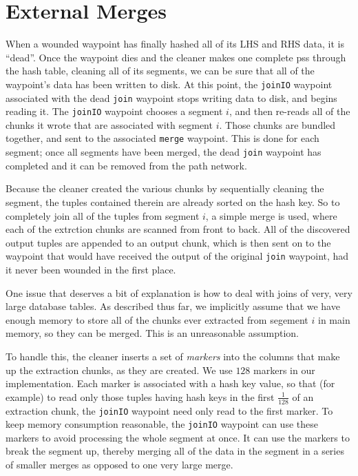 \documentclass{sig-alternate}
\renewcommand\:{\colon} %
\begin{document}
\section{External Merges}

When a wounded waypoint has finally hashed all of its LHS and RHS data, it is ``dead''.  Once the waypoint dies and the cleaner makes one
complete pss through the hash table, cleaning all of its segments, we can be sure that all of the waypoint's data has been written to disk.
At this point, the \texttt{joinIO} waypoint associated with the
dead \texttt{join} waypoint stops writing data to disk, and begins reading it.  The \texttt{joinIO} waypoint chooses
a segment $i$, and then re-reads all of the chunks it wrote that are associated with segment $i$.  Those chunks are bundled together, and sent
to the associated \texttt{merge} waypoint.  This is done for each
segment; once all segments have been merged, the dead \texttt{join} waypoint has completed and it can be removed from the path network.

Because the cleaner created the various chunks by sequentially cleaning the segment, the tuples contained therein are already
sorted on the hash key.  So to completely join all of the tuples from segment $i$, a simple merge is used, where each of the extrction chunks
are scanned from front to back.  All of the discovered output tuples are appended to an output chunk, which is then sent on to the waypoint
that would have received the output of the original \texttt{join} waypoint, had it never been wounded in the first place.

One issue that deserves a bit of explanation is how to deal with joins of very, very large database tables.  As described thus far, we implicitly 
assume that we have enough memory to store all of the chunks ever extracted from segement $i$ in main memory, so they can be merged.  
This is an unreasonable assumption.  

To handle this, the cleaner inserts a set of \emph{markers} into the columns
that make up the extraction
chunks, as they are created.  We use $128$ markers in our implementation.
Each marker is associated with a hash key value, so that (for example)
to read only those tuples having hash keys in the first $\frac{1}{128}$ of an extraction
chunk, the \texttt{joinIO} waypoint need only read to the first marker.  To keep memory consumption reasonable, the \texttt{joinIO} waypoint can use
these markers to avoid processing 
the whole segment at once.  It can use the markers to break the segment up, thereby merging all of the data in the segment in a series
of smaller merges as opposed to one very large merge.
\end{document}
